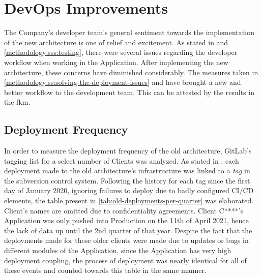 \section{DevOps Improvements}\label{results-and-discussion:s:devops-improvements}

The Company's developer team's general sentiment towards the implementation of the new architecture is one of relief and excitement. As stated in  and \cref{methodology:sss:testing}, there were several issues regarding the developer workflow when working in the Application. After implementing the new architecture, these concerns have diminished considerably. The measures taken in \cref{methodology:ss:solving-the-deployment-issues} and  have brought a new and better workflow to the development team. This can be attested by the results in the \gls{fkm}.

\subsection{Deployment Frequency}\label{results-and-discussion:ss:deployment}

In order to measure the deployment frequency of the old architecture, GitLab's tagging list for a select number of Clients was analyzed. As stated in , each deployment made to the old architecture's infrastructure was linked to a \textit{tag} in the subversion control system. Following the history for each tag since the first day of January 2020, ignoring failures to deploy due to badly configured CI/CD elements, the table present in \cref{tab:old-deployments-per-quarter} was elaborated. Client's names are omitted due to confidentiality agreements. Client C****'s Application was only pushed into Production on the 11th of April 2021, hence the lack of data up until the 2nd quarter of that year. Despite the fact that the deployments made for these older clients were made due to updates or bugs in different modules of the Application, since the Application has very high deployment coupling, the process of deployment was nearly identical for all of these events and counted towards this table in the same manner.



